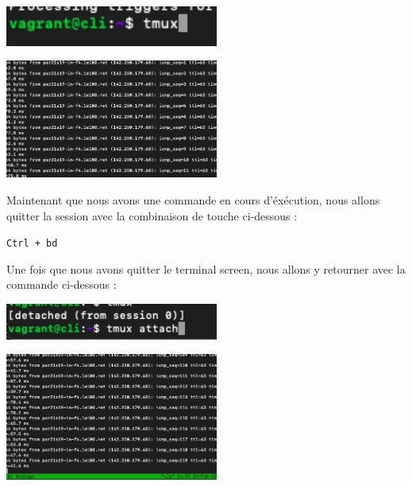 \documentclass[12pt]{article}
\begin{document}
\vspace{0.3cm}

\begin{center}
  \includegraphics[width=7cm]{Image-TD-SSH-9/tmux.png}
\end{center}

\vspace{0.3cm}

\begin{center}
  \includegraphics[width=7cm]{Image-TD-SSH-9/ping-tmux.png}
\end{center}

\vspace{0.3cm}

Maintenant que nous avons une commande en cours d'éxécution, nous allons quitter la session avec la combinaison de touche ci-dessous : 

\texttt{Ctrl + bd}

\newpage

\vspace{0.3cm}

Une fois que nous avons quitter le terminal screen, nous allons y retourner avec la commande ci-dessous : 

\vspace{0.3cm}

\begin{center}
  \includegraphics[width=7cm]{Image-TD-SSH-9/tmux-attach.png}
\end{center}

\vspace{0.3cm}

\begin{center}
  \includegraphics[width=7cm]{Image-TD-SSH-9/return-tmux.png}
\end{center}
\end{document}
